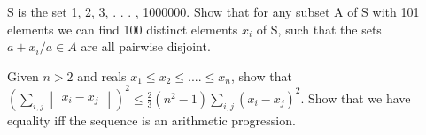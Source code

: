 \item S is the set {1, 2, 3, . . . , 1000000}. Show that for any subset A of S with 101 elements we can find 100 distinct elements $x_i$ of S, such that the sets ${a + x_i/a \in A}$ are all pairwise disjoint.\\

\item Given $n > 2$ and reals $x_1 \leq x_2 \leq .... \leq x_n$, show that
$(\sum_{i,j}\begin{vmatrix} x_i - x_j \end{vmatrix})^2 \leq \frac{2}{3}(n^2 -1) \sum_{i,j}(x_i -x_j)^2$. Show that we have equality iff the sequence is an arithmetic progression.


